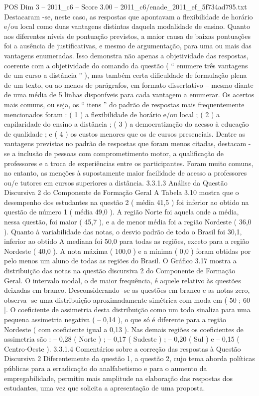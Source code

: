 \begin{textsample}{POS Dim 3 – 2011\_c6 – Score 3.00 – 2011\_c6/enade\_2011\_ef\_5f734ad795.txt}
Destacaram -se, neste caso, as respostas que apontavam a flexibilidade de horário e/ou local como duas vantagens distintas daquela modalidade de ensino.
Quanto aos diferentes níveis de pontuação previstos, a maior causa de baixas pontuações foi a ausência de justificativas, e mesmo de argumentação, para uma ou mais das vantagens enumeradas.
Isso demonstra não apenas a objetividade das respostas, coerente com a objetividade do comando da questão ( “ enumere três vantagens de um curso a distância ” ), mas também certa dificuldade de formulação plena de um texto, ou ao menos de parágrafos, em formato dissertativo – mesmo diante de uma média de 5 linhas disponíveis para cada vantagem a enumerar.
Os acertos mais comuns, ou seja, os “ itens ” do padrão de respostas mais frequentemente mencionados foram : ( 1 ) a flexibilidade de horário e/ou local ; ( 2 ) a capilaridade do ensino a distância ; ( 3 ) a democratização do acesso à educação de qualidade ; e ( 4 ) os custos menores que os de cursos presenciais.
Dentre as vantagens previstas no padrão de respostas que foram menos citadas, destacam -se a inclusão de pessoas com comprometimento motor, a qualificação de professores e a troca de experiências entre os participantes.
Foram muito comuns, no entanto, as menções à supostamente maior facilidade de acesso a professores ou/e tutores em cursos superiores a distância. 3.3.1.3 Análise da Questão Discursiva 2 do Componente de Formação Geral A Tabela 3.10 mostra que o desempenho dos estudantes na questão 2 ( média 41,5 ) foi inferior ao obtido na questão de número 1 ( média 49,0 ).
A região Norte foi aquela onde a média, nessa questão, foi maior ( 45,7 ), e a de menor média foi a região Nordeste ( 36,0 ).
Quanto à variabilidade das notas, o desvio padrão de todo o Brasil foi 30,1, inferior ao obtido A mediana foi 50,0 para todas as regiões, exceto para a região Nordeste ( 40,0 ).
A nota máxima ( 100,0 ) e a mínima ( 0,0 ) foram obtidas por pelo menos um aluno de todas as regiões do Brasil.
O Gráfico 3.17 mostra a distribuição das notas na questão discursiva 2 do Componente de Formação Geral.
O intervalo modal, o de maior frequência, é aquele relativo às questões deixadas em branco.
Desconsiderando -se as questões em branco e as notas zero, observa -se uma distribuição aproximadamente simétrica com moda em ( 50 ; 60 ].
O coeficiente de assimetria desta distribuição como um todo sinaliza para uma pequena assimetria negativa ( – 0,14 ), o que só é diferente para a região Nordeste ( com coeficiente igual a 0,13 ).
Nas demais regiões os coeficientes de assimetria são : – 0,28 ( Norte ) ; – 0,17 ( Sudeste ) ; – 0,20 ( Sul ) e – 0,15 ( Centro-Oeste ). 3.3.1.4 Comentários sobre a correção das respostas à Questão Discursiva 2 Diferentemente da questão 1, a questão 2, cujo tema aborda políticas públicas para a erradicação do analfabetismo e para o aumento da empregabilidade, permitiu mais amplitude na elaboração das respostas dos estudantes, uma vez que solicita a apresentação de uma proposta.

\end{textsample}
